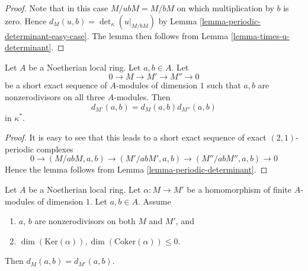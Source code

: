 \begin{proof}
Note that in this case $M/ubM = M/bM$ on which multiplication
by $b$ is zero. Hence $d_M(u, b) = \det_\kappa(u|_{M/bM})$
by Lemma \ref{lemma-periodic-determinant-easy-case}. The lemma
then follows from Lemma \ref{lemma-times-u-determinant}.
\end{proof}

\begin{lemma}
\label{lemma-symbol-short-exact-sequence}
Let $A$ be a Noetherian local ring.
Let $a, b \in A$.
Let
$$
0 \to M \to M' \to M'' \to 0
$$
be a short exact sequence of $A$-modules of dimension $1$
such that $a, b$ are nonzerodivisors on
all three $A$-modules.
Then
$$
d_{M'}(a, b) = d_M(a, b) d_{M''}(a, b)
$$
in $\kappa^*$.
\end{lemma}

\begin{proof}
It is easy to see that this leads to a short exact sequence
of exact $(2, 1)$-periodic complexes
$$
0 \to
(M/abM, a, b) \to
(M'/abM', a, b) \to
(M''/abM'', a, b) \to 0
$$
Hence the lemma follows from Lemma \ref{lemma-periodic-determinant}.
\end{proof}

\begin{lemma}
\label{lemma-symbol-compare-modules}
Let $A$ be a Noetherian local ring.
Let $\alpha : M \to M'$ be a homomorphism of
finite $A$-modules of dimension $1$.
Let $a, b \in A$. Assume
\begin{enumerate}
\item $a$, $b$ are nonzerodivisors on both $M$ and $M'$, and
\item $\dim(\text{Ker}(\alpha)), \dim(\text{Coker}(\alpha)) \leq 0$.
\end{enumerate}
Then $d_M(a, b) = d_{M'}(a, b)$.
\end{lemma}

